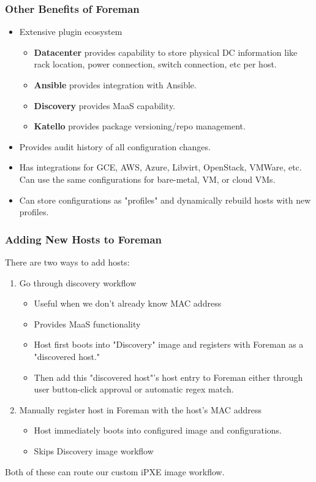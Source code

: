 \documentclass{beamer}
\begin{document}
\begin{frame}
	\frametitle{Other Benefits of Foreman}
	\begin{itemize}
		\item Extensive plugin ecosystem
		      \begin{itemize}
			      \item \textbf{Datacenter} provides capability to store physical DC information like rack location, power connection, switch connection, etc per host.
			      \item \textbf{Ansible} provides integration with Ansible.
			      \item \textbf{Discovery} provides MaaS capability.
			      \item \textbf{Katello} provides package versioning/repo management.
		      \end{itemize}
		\item Provides audit history of all configuration changes.
		\item Has integrations for GCE, AWS, Azure, Libvirt, OpenStack, VMWare, etc. Can use the same configurations for bare-metal, VM, or cloud VMs.
		\item Can store configurations as "profiles" and dynamically rebuild hosts with new profiles.
	\end{itemize}
\end{frame}

\begin{frame}
	\frametitle{Adding New Hosts to Foreman}
	There are two ways to add hosts:
	\begin{enumerate}
		\item Go through discovery workflow
		      \begin{itemize}
			      \item Useful when we don't already know MAC address
			      \item Provides MaaS functionality
			      \item Host first boots into "Discovery" image and registers with Foreman as a "discovered host."
			      \item Then add this "discovered host"'s host entry to Foreman either through user button-click approval or automatic regex match.
		      \end{itemize}
		\item Manually register host in Foreman with the host's MAC address
		      \begin{itemize}
			      \item Host immediately boots into configured image and configurations.
			      \item Skips Discovery image workflow
		      \end{itemize}
	\end{enumerate}
	Both of these can route our custom iPXE image workflow.
\end{frame}
\end{document}
